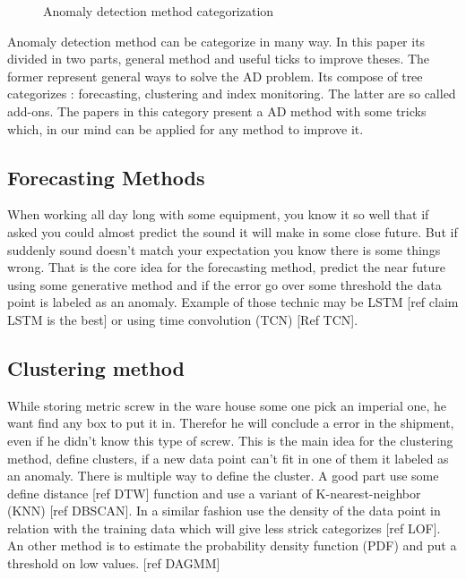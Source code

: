 \documentclass[../../main/main.tex]{subfiles}
\begin{document}
    \begin{figure*}[hp]
        \makebox[\textwidth]{}
        \caption{Anomaly detection method categorization}
    \end{figure*}

    Anomaly detection method can be categorize in many way. In this paper its divided in two parts,
    general method and useful ticks to improve theses. The former represent general ways to 
    solve the AD problem. Its compose of tree categorizes : forecasting, clustering and index monitoring.
    The latter are so called add-ons. The papers in this category present a AD method with some tricks which,
    in our mind can be applied for any method to improve it.
    \subsection{Forecasting Methods}
        When working all day long with some equipment, you know it so well that if asked you could almost 
        predict the sound it will make in some close future. But if suddenly sound doesn't match 
        your expectation  you know there is some things wrong.
        That is the core idea for the forecasting method, predict the near future using some generative method
        and if the error go over some threshold the data point is labeled as an anomaly. Example of those technic 
        may be LSTM [ref claim LSTM is the best] or using time convolution (TCN) [Ref TCN].
    
    \subsection{Clustering method}
        While storing metric screw in the ware house some one pick an imperial one, he want find any box to put it in.
        Therefor he will conclude a error in the shipment, even if he didn't know this type of screw. This is the main 
        idea for the clustering method, define clusters, if a new data point can't fit in one of them it labeled as an anomaly.  
        There is multiple way to define the cluster. A good part use some define distance [ref DTW] function and use a variant of K-nearest-neighbor (KNN)
        [ref DBSCAN]. In a similar fashion use the density of the data point in relation with the training data which will 
        give less strick categorizes [ref LOF]. An other method is to estimate the probability density function (PDF) 
        and put a threshold on low values. [ref DAGMM]
\end{document}
